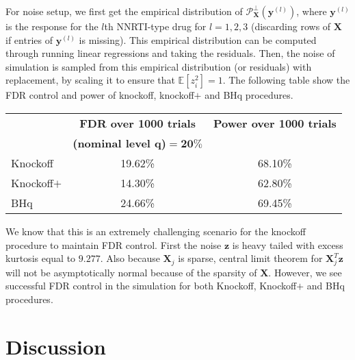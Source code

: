\documentclass{uwstat572}
\begin{document}
For noise setup, we first get the empirical distribution of $\mathcal{P}_{\bm{X}}^{\perp}(\bm{y}^{(l)})$, where $\bm{y}^{(l)}$ is the response for the $l$th NNRTI-type drug for $l=1,2,3$ (discarding rows of $\bm{X}$ if entries of $\bm{y}^{(l)}$ is missing). This empirical distribution can be computed through running linear regressions and taking the residuals. Then, the noise of simulation is sampled from this empirical distribution (or residuals) with replacement, by scaling it to ensure that $\mathbb{E}[z_i^2]=1$. The following table show the FDR control and power of knockoff, knockoff$+$ and BHq procedures.

\begin{table}[!htb]
	\centering
	\label{tbl:nonGaus}
	\begin{tabular}{lcc}
		\hline
		& {\bf FDR over 1000 trials } & \textbf{Power over 1000 trials} \\
		& \textbf{(nominal level q)$\bm{=20\%}$} & \\ \hline
		Knockoff	& 19.62\% & 68.10\% \\
		Knockoff$+$	& 14.30\% & 62.80\% \\
		BHq	& 24.66\%  & 69.45\% \\ \hline
	\end{tabular}
\end{table}

We know that this is an extremely challenging scenario for the knockoff procedure to maintain FDR control. First the noise $\bm{z}$ is heavy tailed with excess kurtosis equal to $9.277$. Also because $\bm{X}_j$ is sparse, central limit theorem for $\bm{X}_j^T\bm{z}$ will not be asymptotically normal because of the sparsity of $\bm{X}$. However, we see successful FDR control in the simulation for both Knockoff, Knockoff$+$ and BHq procedures. 
\section{Discussion}


\end{document}
